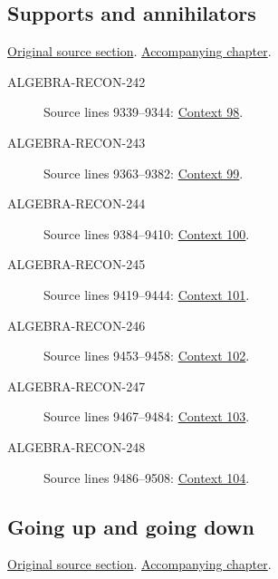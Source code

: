 \subsection{Supports and annihilators}
\hypertarget{algebra-source-section-supp-and-ann}{}
\noindent\href{https://github.com/stacks/stacks-project/blob/a04446e57ec1fbc252a871afcec7752fb2807b14/algebra.tex\#L9307}{Original source section}. \href{algebra.pdf\#nameddest=section-supp-and-ann}{Accompanying chapter}.

\begin{description}
\item[ALGEBRA-RECON-242] Source lines 9339--9344: \hyperlink{algebra-context-098}{Context 98}.
\item[ALGEBRA-RECON-243] Source lines 9363--9382: \hyperlink{algebra-context-099}{Context 99}.
\item[ALGEBRA-RECON-244] Source lines 9384--9410: \hyperlink{algebra-context-100}{Context 100}.
\item[ALGEBRA-RECON-245] Source lines 9419--9444: \hyperlink{algebra-context-101}{Context 101}.
\item[ALGEBRA-RECON-246] Source lines 9453--9458: \hyperlink{algebra-context-102}{Context 102}.
\item[ALGEBRA-RECON-247] Source lines 9467--9484: \hyperlink{algebra-context-103}{Context 103}.
\item[ALGEBRA-RECON-248] Source lines 9486--9508: \hyperlink{algebra-context-104}{Context 104}.
\end{description}

\subsection{Going up and going down}
\hypertarget{algebra-source-section-going-up}{}
\noindent\href{https://github.com/stacks/stacks-project/blob/a04446e57ec1fbc252a871afcec7752fb2807b14/algebra.tex\#L9514}{Original source section}. \href{algebra.pdf\#nameddest=section-going-up}{Accompanying chapter}.

